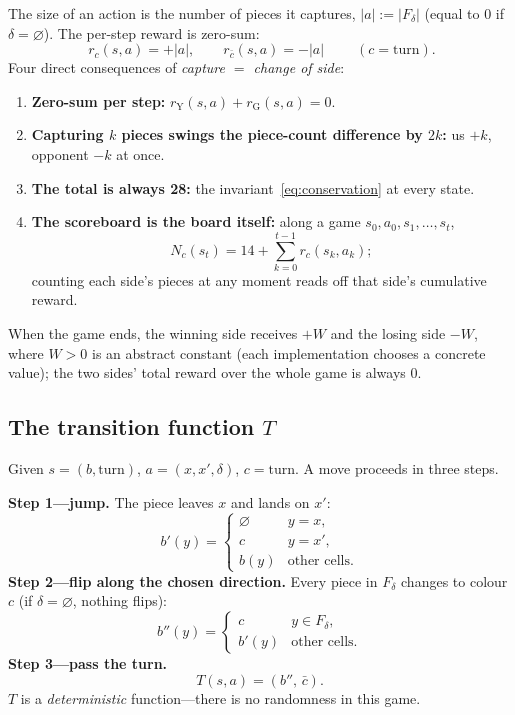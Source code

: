 The size of an action is the number of pieces it captures, $|a|:=|F_\delta|$
(equal to $0$ if $\delta=\varnothing$). The per-step reward is zero-sum:
\begin{equation}
\boxed{\;r_c(s,a)=+|a|,\qquad r_{\bar c}(s,a)=-|a|\;}
\qquad (c=\mathrm{turn}).
\label{eq:reward}
\end{equation}
Four direct consequences of \emph{capture $=$
change of side}:
\begin{enumerate}[label=(\arabic*),noitemsep,topsep=2pt]
  \item \textbf{Zero-sum per step:} $r_{\mathrm Y}(s,a)+r_{\mathrm G}(s,a)=0$.
  \item \textbf{Capturing $k$ pieces swings the piece-count difference by
        $2k$:} us $+k$, opponent $-k$ at once.
  \item \textbf{The total is always 28:} the invariant~\eqref{eq:conservation}
        at every state.
  \item \textbf{The scoreboard is the board itself:} along a game
        $s_0,a_0,s_1,\dots,s_t$,
        \begin{equation}
        N_c(s_t)=14+\sum_{k=0}^{t-1} r_c(s_k,a_k);
        \label{eq:scoreboard}
        \end{equation}
        counting each side's pieces at any moment reads off that side's
        cumulative reward.
\end{enumerate}
When the game ends, the winning side receives $+W$ and the losing side $-W$,
where $W>0$ is an abstract constant (each implementation chooses a concrete
value); the two sides' total reward over the whole game is always $0$.

\subsection{The transition function $T$}
\label{ssec:transition}

Given $s=(b,\mathrm{turn})$, $a=(x,x',\delta)$, $c=\mathrm{turn}$. A move
proceeds in three steps.

\noindent\textbf{Step 1---jump.} The piece leaves $x$ and lands on $x'$:
\begin{equation}
b'(y)=\begin{cases}\varnothing & y=x,\\ c & y=x',\\ b(y) & \text{other cells}.\end{cases}
\label{eq:t1}
\end{equation}
\textbf{Step 2---flip along the chosen direction.} Every piece in $F_\delta$
changes to colour $c$ (if $\delta=\varnothing$, nothing flips):
\begin{equation}
b''(y)=\begin{cases}c & y\in F_\delta,\\ b'(y) & \text{other cells}.\end{cases}
\label{eq:t2}
\end{equation}
\textbf{Step 3---pass the turn.}
\begin{equation}
\boxed{\;T(s,a)=(b'',\,\bar c).\;}
\label{eq:t3}
\end{equation}
$T$ is a \emph{deterministic} function---there is no randomness in this game.

